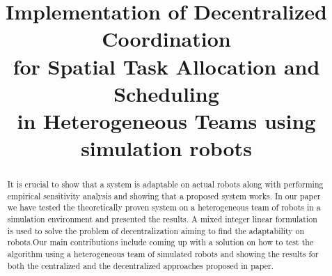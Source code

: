 \documentclass[conference]{IEEEtran}
\begin{document}
%
\title{Implementation of Decentralized Coordination\\ for Spatial Task Allocation
and Scheduling\\ in Heterogeneous Teams using simulation robots}


\author{
\and 
{}
}


% 
\maketitle

\begin{abstract}
It is crucial to show that a system is adaptable on actual robots along with performing empirical sensitivity analysis and showing that a proposed system works. In our paper we have tested the theoretically proven system on a heterogeneous team of robots in a simulation environment and presented the results. A mixed integer linear formulation\cite{feo2016decentralized} is used to solve the problem of decentralization aiming to find the adaptability on robots.Our main contributions include coming up with a solution on how to test the algorithm using a heterogeneous team of simulated robots and showing the results for both the centralized and the decentralized approaches proposed in paper\cite{feo2016decentralized}.  
\end{abstract}
\end{document}
